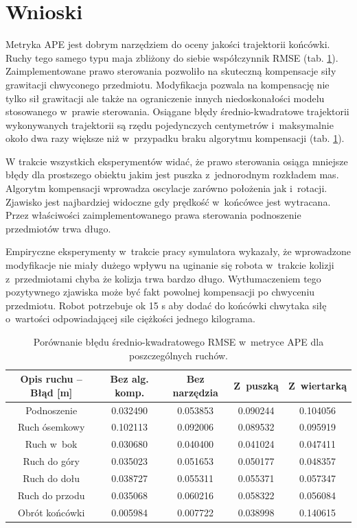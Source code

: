 \section{Wnioski}

Metryka APE jest dobrym narzędziem do oceny jakości trajektorii końcówki. Ruchy tego samego typu maja zbliżony do siebie współczynnik RMSE (tab. \ref{tab:}). 
Zaimplementowane prawo sterowania pozwoliło na skuteczną kompensacje siły grawitacji chwyconego przedmiotu. Modyfikacja pozwala na kompensację nie tylko sił grawitacji ale także na ograniczenie innych niedoskonałości modelu stosowanego w~prawie sterowania. Osiągane błędy średnio-kwadratowe trajektorii wykonywanych trajektorii są rzędu pojedynczych centymetrów i~maksymalnie około dwa razy większe niż w~przypadku braku algorytmu kompensacji (tab. \ref{tab:}). 

W trakcie wszystkich eksperymentów widać, że prawo sterowania osiąga mniejsze błędy dla prostszego obiektu jakim jest puszka z~jednorodnym rozkładem mas. Algorytm kompensacji wprowadza oscylacje zarówno położenia jak i~rotacji. Zjawisko jest najbardziej widoczne gdy prędkość w~końcówce jest wytracana. Przez właściwości zaimplementowanego prawa sterowania podnoszenie przedmiotów trwa długo. 

Empiryczne eksperymenty w~trakcie pracy symulatora wykazały, że wprowadzone modyfikacje nie miały dużego wpływu na uginanie się robota w~trakcie kolizji z~przedmiotami chyba że kolizja trwa bardzo długo. Wytłumaczeniem tego pozytywnego zjawiska może być fakt powolnej kompensacji po chwyceniu przedmiotu. Robot potrzebuje ok 15 s aby dodać do końcówki chwytaka siłę o~wartości odpowiadającej sile ciężkości jednego kilograma. 

{\small
\begin{table}[H]

	\begin{tabular}{||c | c c c c ||}

		\hline

		Opis ruchu --  Błąd [m]  &  Bez alg. komp. & Bez narzędzia & Z~puszką  & Z~wiertarką  \\ [0.5ex]

		\hline\hline

		Podnoszenie & 0.032490 & 0.053853 & 0.090244 & 0.104056 \\
		Ruch ósemkowy &0.102113  & 0.092006 & 0.089532 & 0.095919 \\
		Ruch w~bok & 0.030680 & 0.040400 & 0.041024 &  0.047411\\
		Ruch do góry & 0.035023 & 0.051653 & 0.050177& 0.048357 \\
		Ruch do dołu & 0.038727 & 0.055311 & 0.055371 & 0.057347 \\
		Ruch do przodu & 0.035068 & 0.060216 & 0.058322 & 0.056084 \\
		Obrót końcówki & 0.005984 & 0.007722 & 0.038998 & 0.140615\\
		\hline

	\end{tabular}

	\caption{Porównanie błędu średnio-kwadratowego RMSE w~metryce APE dla poszczególnych ruchów.}

	\label{tab:}

\end{table}
}